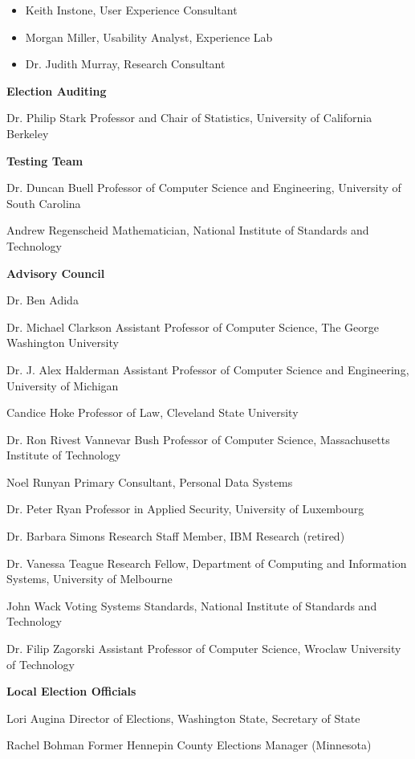 \begin{itemize}
\item Keith Instone, User Experience Consultant
\item Morgan Miller, Usability Analyst, Experience Lab
\item Dr. Judith Murray, Research Consultant
\end{itemize}

\textbf{Election Auditing}

Dr. Philip Stark
Professor and Chair of Statistics, University of California Berkeley
 
\textbf{Testing Team}

Dr. Duncan Buell
Professor of Computer Science and Engineering, University of South Carolina
 
Andrew Regenscheid
Mathematician, National Institute of Standards and Technology
 
\textbf{Advisory Council}

Dr. Ben Adida
 
Dr. Michael Clarkson
Assistant Professor of Computer Science, The George Washington University
 
Dr. J. Alex Halderman
Assistant Professor of Computer Science and Engineering, University of Michigan
 
Candice Hoke
Professor of Law, Cleveland State University
 
Dr. Ron Rivest
Vannevar Bush Professor of Computer Science, Massachusetts Institute of Technology
 
Noel Runyan
Primary Consultant, Personal Data Systems
 
Dr. Peter Ryan
Professor in Applied Security, University of Luxembourg
 
Dr. Barbara Simons
Research Staff Member, IBM Research (retired)
 
Dr. Vanessa Teague
Research Fellow, Department of Computing and Information Systems, University of Melbourne
 
John Wack
Voting Systems Standards, National Institute of Standards and Technology
 
Dr. Filip Zagorski
Assistant Professor of Computer Science, Wroclaw University of Technology
 
\textbf{Local Election Officials}

Lori Augina
Director of Elections, Washington State, Secretary of State

Rachel Bohman
Former Hennepin County Elections Manager (Minnesota)

